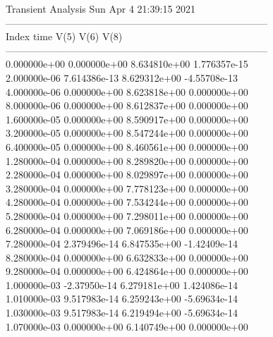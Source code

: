                                    Transient Analysis  Sun Apr  4 21:39:15  2021\\ \hline
--------------------------------------------------------------------------------\\ \hline
Index   time            V(5)            V(6)            V(8)            \\ \hline
--------------------------------------------------------------------------------\\ 	0.000000e+00	0.000000e+00	8.634810e+00	1.776357e-15	\\ 	2.000000e-06	7.614386e-13	8.629312e+00	-4.55708e-13	\\ 	4.000000e-06	0.000000e+00	8.623818e+00	0.000000e+00	\\ 	8.000000e-06	0.000000e+00	8.612837e+00	0.000000e+00	\\ 	1.600000e-05	0.000000e+00	8.590917e+00	0.000000e+00	\\ 	3.200000e-05	0.000000e+00	8.547244e+00	0.000000e+00	\\ 	6.400000e-05	0.000000e+00	8.460561e+00	0.000000e+00	\\ 	1.280000e-04	0.000000e+00	8.289820e+00	0.000000e+00	\\ 	2.280000e-04	0.000000e+00	8.029897e+00	0.000000e+00	\\ 	3.280000e-04	0.000000e+00	7.778123e+00	0.000000e+00	\\ 	4.280000e-04	0.000000e+00	7.534244e+00	0.000000e+00	\\ 	5.280000e-04	0.000000e+00	7.298011e+00	0.000000e+00	\\ 	6.280000e-04	0.000000e+00	7.069186e+00	0.000000e+00	\\ 	7.280000e-04	2.379496e-14	6.847535e+00	-1.42409e-14	\\ 	8.280000e-04	0.000000e+00	6.632833e+00	0.000000e+00	\\ 	9.280000e-04	0.000000e+00	6.424864e+00	0.000000e+00	\\ 	1.000000e-03	-2.37950e-14	6.279181e+00	1.424086e-14	\\ 	1.010000e-03	9.517983e-14	6.259243e+00	-5.69634e-14	\\ 	1.030000e-03	9.517983e-14	6.219494e+00	-5.69634e-14	\\ 	1.070000e-03	0.000000e+00	6.140749e+00	0.000000e+00	\\ \hline
